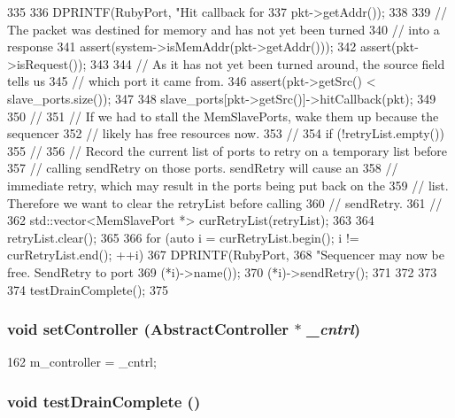 \begin{DoxyCode}
335 {
336     DPRINTF(RubyPort, "Hit callback for %
337             pkt->getAddr());
338 
339     // The packet was destined for memory and has not yet been turned
340     // into a response
341     assert(system->isMemAddr(pkt->getAddr()));
342     assert(pkt->isRequest());
343 
344     // As it has not yet been turned around, the source field tells us
345     // which port it came from.
346     assert(pkt->getSrc() < slave_ports.size());
347 
348     slave_ports[pkt->getSrc()]->hitCallback(pkt);
349 
350     //
351     // If we had to stall the MemSlavePorts, wake them up because the sequencer
352     // likely has free resources now.
353     //
354     if (!retryList.empty()) {
355         //
356         // Record the current list of ports to retry on a temporary list before
357         // calling sendRetry on those ports.  sendRetry will cause an 
358         // immediate retry, which may result in the ports being put back on the
359         // list. Therefore we want to clear the retryList before calling
360         // sendRetry.
361         //
362         std::vector<MemSlavePort *> curRetryList(retryList);
363 
364         retryList.clear();
365 
366         for (auto i = curRetryList.begin(); i != curRetryList.end(); ++i) {
367             DPRINTF(RubyPort,
368                     "Sequencer may now be free.  SendRetry to port %
369                     (*i)->name());
370             (*i)->sendRetry();
371         }
372     }
373 
374     testDrainComplete();
375 }
\end{DoxyCode}
\hypertarget{classRubyPort_a0768dd0d813b0d71fd45a5deb1bd0294}{
\subsubsection[{setController}]{\setlength{\rightskip}{0pt plus 5cm}void setController ({\bf AbstractController} $\ast$ {\em \_\-cntrl})}}
\label{classRubyPort_a0768dd0d813b0d71fd45a5deb1bd0294}



\begin{DoxyCode}
162 { m_controller = _cntrl; }
\end{DoxyCode}
\hypertarget{classRubyPort_ada43967d9f25e87e20fa808ff7d88a89}{
\subsubsection[{testDrainComplete}]{\setlength{\rightskip}{0pt plus 5cm}void testDrainComplete ()}}
\label{classRubyPort_ada43967d9f25e87e20fa808ff7d88a89}



